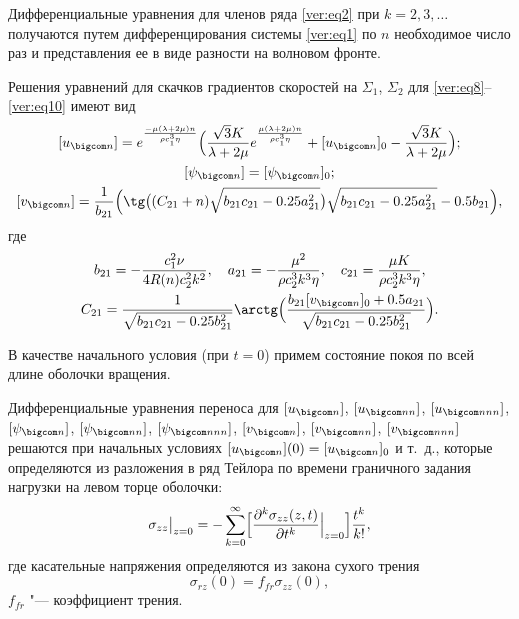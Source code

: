 Дифференциальные уравнения для членов ряда \eqref{ver:eq2} при $k=2,3,\dots$ получаются путем дифференцирования системы \eqref{ver:eq1} по $n$ необходимое число раз и представления ее в виде разности на волновом фронте.

Решения уравнений для скачков градиентов скоростей на $\Sigma_1$, $\Sigma_2$ для \eqref{ver:eq8}--\eqref{ver:eq10} имеют вид
\begin{gather}
\label{ver:eq11}
[u_{\bigcom n}]=e^{\frac{-\mu(\lambda+2\mu)n}{\rho c_1^3\eta}}
\Bigl(\frac{\sqrt{3}K}{\lambda+2\mu}e^{\frac{\mu(\lambda+2\mu)n}{\rho c_1^3\eta}}+[u_{\bigcom n}]_0-\frac{\sqrt{3}K}{\lambda+2\mu}\Bigr);
\\
\label{ver:eq12}
[\psi_{\bigcom n}]=[\psi_{\bigcom n}]_0;
\\
\label{ver:eq13}
[v_{\bigcom n}]=\frac1{b_{21}}\Bigl( {\tg\bigl((C_{21}+n)\sqrt{b_{21}c_{21}-0.25a_{21}^2}\bigr)\sqrt{b_{21}c_{21}-0.25a_{21}^2}-0.5 b_{21}}
\Bigr)
,
\end{gather}
где 
\begin{gather*}
b_{21}=-\frac{c_1^2 \nu}{4 R(n) c_2^2 k^2}, \quad  
a_{21}=-\frac{\mu^2}{\rho c_2^3 k^3 \eta}, \quad  c_{21}=\frac{\mu K}{\rho c_2^3 k^3 \eta},
\\
C_{21}=\frac1{\sqrt{b_{21} c_{21}-0.25 b_{21}^2}} 
{\arctg\Bigl(\frac{b_{21}[v_{\bigcom n}]_0+0.5 a_{21}}{\sqrt{b_{21} c_{21}-0.25 b_{21}^2}}\Bigr)}.
\end{gather*}

В качестве начального условия (при $t=0$) примем состояние покоя по всей длине оболочки вращения.

Дифференциальные уравнения переноса для $[u_{\bigcom n}]$, $[u_{\bigcom nn}]$, $[u_{\bigcom nnn}]$, $[\psi_{\bigcom n}]$, $[\psi_{\bigcom nn}]$, $[\psi_{\bigcom nnn}]$, $[v_{\bigcom n}]$, $[v_{\bigcom nn}]$, $[v_{\bigcom nnn}]$ решаются при начальных условиях $[u_{\bigcom n}](0)=[u_{\bigcom n}]_0$ и т.~д., которые определяются из разложения в ряд Тейлора по времени граничного задания нагрузки на левом торце оболочки:
\begin{equation}
\label{ver:eq14}
\sigma_{zz}\bigr|_{z=0}=-\sum^{\infty}_{k=0}
\Bigl[
\frac{\partial^k \sigma_{zz}(z, t)}{\partial t^k}\Bigr|_{z=0} \Bigr]\frac{t^k}{k!},
\end{equation}
где касательные напряжения %
определяются из закона сухого трения $$\sigma_{rz}(0)=f_{fr}\sigma_{zz}(0),$$ $f_{fr}$ "--- коэффициент трения.

